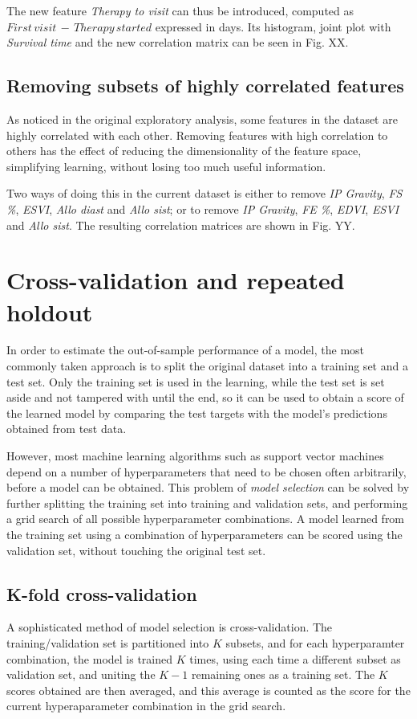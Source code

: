 \documentclass[12pt]{report}
\begin{document}
The new feature \textit{Therapy to visit} can thus be introduced, computed as $ First\, visit\, -\, Therapy\, started $ expressed in days. Its histogram, joint plot with \textit{Survival time} and the new correlation matrix can be seen in Fig. XX.

\subsection*{Removing subsets of highly correlated features}
As noticed in the original exploratory analysis, some features in the dataset are highly correlated with each other. Removing features with high correlation to others has the effect of reducing the dimensionality of the feature space, simplifying learning, without losing too much useful information.

Two ways of doing this in the current dataset is either to remove \textit{IP Gravity}, \textit{FS \%}, \textit{ESVI}, \textit{Allo diast} and \textit{Allo sist}; or to remove \textit{IP Gravity}, \textit{FE \%}, \textit{EDVI}, \textit{ESVI} and \textit{Allo sist}. The resulting correlation matrices are shown in Fig. YY.

\section{Cross-validation and repeated holdout}
In order to estimate the out-of-sample performance of a model, the most commonly taken approach is to split the original dataset into a training set and a test set. Only the training set is used in the learning, while the test set is set aside and not tampered with until the end, so it can be used to obtain a score of the learned model by comparing the test targets with the model's predictions obtained from test data.

However, most machine learning algorithms such as support vector machines depend on a number of hyperparameters that need to be chosen often arbitrarily, before a model can be obtained. This problem of \textit{model selection} can be solved by further splitting the training set into training and validation sets, and performing a grid search of all possible hyperparameter combinations. A model learned from the training set using a combination of hyperparameters can be scored using the validation set, without touching the original test set.

\subsection*{K-fold cross-validation}
A sophisticated method of model selection is cross-validation. The training/validation set is partitioned into $ K $ subsets, and for each hyperparamter combination, the model is trained $ K $ times, using each time a different subset as validation set, and uniting the $ K - 1 $ remaining ones as a training set. The $ K $ scores obtained are then averaged, and this average is counted as the score for the current hyperaparameter combination in the grid search.
\end{document}
